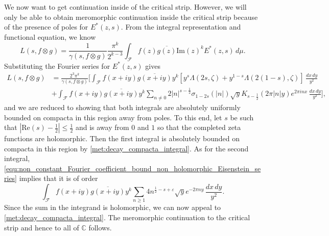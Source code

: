 \documentclass[12pt]{book}
\theoremstyle{definition}\newframedtheorem{method}{Method}
\newcommand{\mc}{\mathcal}
\newcommand{\C}{\mathbb{C}}
\newcommand{\g}{\gamma}
\newcommand{\z}{\zeta}
\newcommand{\s}{\sigma}
\renewcommand{\L}{\Lambda}
\newcommand{\e}{\varepsilon}
\newcommand{\ox}{\otimes}
\newcommand{\<}{\langle}
\renewcommand{\>}{\rangle}
\newcommand{\conj}{\overline}
\renewcommand{\Re}{\mathrm{Re}}
\renewcommand{\Im}{\mathrm{Im}}
\begin{document}
      We now want to get continuation inside of the critical strip. However, we will only be able to obtain meromorphic continuation inside the critical strip because of the presence of poles for $E^{\ast}(z,s)$. From the integral representation and functional equation, we know
      \[
        L(s,f \ox g) = \frac{1}{\g(s,f \ox g)}\frac{\pi^{k}}{2^{k-3}}\int_{\mc{F}}f(z)\conj{g(z)}\Im(z)^{k}E^{\ast}(z,s)\,d\mu.
      \]
      Substituting the Fourier series for $E^{\ast}(z,s)$ gives
      \begin{equation}\label{equ:integral_representation_Rankin_Selberg}
        \begin{split}
          L(s,f \ox g) &= \frac{2^{3}\pi^{k}}{\g(s,f \ox g)}\bigg[\int_{\mc{F}}f(x+iy)\conj{g(x+iy)}y^{k}[y^{s}\L(2s,\z)+y^{1-s}\L(2(1-s),\z)]\,\frac{dx\,dy}{y^{2}} \\
          &+\int_{\mc{F}}f(x+iy)\conj{g(x+iy)}y^{k}\sum_{n \neq 0}2|n|^{s-\frac{1}{2}}\s_{1-2s}(|n|)\sqrt{y}K_{s-\frac{1}{2}}(2\pi|n|y)e^{2\pi inx}\,\frac{dx\,dy}{y^{2}}\bigg],
        \end{split}
      \end{equation}
      and we are reduced to showing that both integrals are absolutely uniformly bounded on compacta in this region away from poles. To this end, let $s$ be such that $|\Re(s)-\frac{1}{2}| \le \frac{1}{2}$ and is away from $0$ and $1$ so that the completed zeta functions are holomorphic. Then the first integral is absolutely bounded on compacta in this region by \cref{met:decay_compacta_integral}. As for the second integral, \cref{equ:non_constant_Fourier_coefficient_bound_non_holomorphic_Eisenstein_series} implies that it is of order
      \[
        \int_{\mc{F}}f(x+iy)\conj{g(x+iy)}y^{k}\sum_{n \ge 1}4n^{\frac{1}{2}-s+\e}\sqrt{y}e^{-2\pi ny}\,\frac{dx\,dy}{y^{2}}.
      \]
      Since the sum in the integrand is holomorphic, we can now appeal to \cref{met:decay_compacta_integral}. The meromorphic continuation to the critical strip and hence to all of $\C$ follows.
\end{document}
